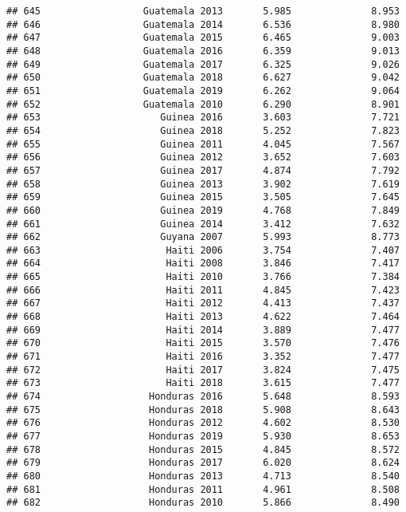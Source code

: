 \documentclass[
]{article}
\begin{document}
\begin{verbatim}
## 645                  Guatemala 2013       5.985              8.953
## 646                  Guatemala 2014       6.536              8.980
## 647                  Guatemala 2015       6.465              9.003
## 648                  Guatemala 2016       6.359              9.013
## 649                  Guatemala 2017       6.325              9.026
## 650                  Guatemala 2018       6.627              9.042
## 651                  Guatemala 2019       6.262              9.064
## 652                  Guatemala 2010       6.290              8.901
## 653                     Guinea 2016       3.603              7.721
## 654                     Guinea 2018       5.252              7.823
## 655                     Guinea 2011       4.045              7.567
## 656                     Guinea 2012       3.652              7.603
## 657                     Guinea 2017       4.874              7.792
## 658                     Guinea 2013       3.902              7.619
## 659                     Guinea 2015       3.505              7.645
## 660                     Guinea 2019       4.768              7.849
## 661                     Guinea 2014       3.412              7.632
## 662                     Guyana 2007       5.993              8.773
## 663                      Haiti 2006       3.754              7.407
## 664                      Haiti 2008       3.846              7.417
## 665                      Haiti 2010       3.766              7.384
## 666                      Haiti 2011       4.845              7.423
## 667                      Haiti 2012       4.413              7.437
## 668                      Haiti 2013       4.622              7.464
## 669                      Haiti 2014       3.889              7.477
## 670                      Haiti 2015       3.570              7.476
## 671                      Haiti 2016       3.352              7.477
## 672                      Haiti 2017       3.824              7.475
## 673                      Haiti 2018       3.615              7.477
## 674                   Honduras 2016       5.648              8.593
## 675                   Honduras 2018       5.908              8.643
## 676                   Honduras 2012       4.602              8.530
## 677                   Honduras 2019       5.930              8.653
## 678                   Honduras 2015       4.845              8.572
## 679                   Honduras 2017       6.020              8.624
## 680                   Honduras 2013       4.713              8.540
## 681                   Honduras 2011       4.961              8.508
## 682                   Honduras 2010       5.866              8.490

\end{verbatim}
\end{document}
